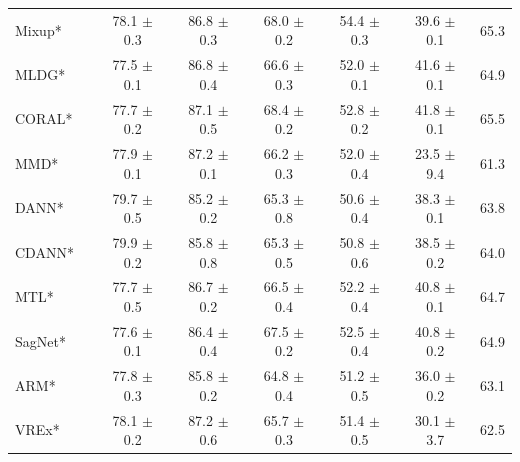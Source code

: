 \begin{table}[t]
\begin{tabular}{llcccccc}
Mixup*               &   \citep{yan2020improve}            		 & 78.1 $\pm$ 0.3            & 86.8 $\pm$ 0.3            & 68.0 $\pm$ 0.2            & 54.4 $\pm$ 0.3            & 39.6 $\pm$ 0.1            & 65.3                      \\
MLDG*                 &  \citep{LiYSH18}           				& 77.5 $\pm$ 0.1            & 86.8 $\pm$ 0.4            & 66.6 $\pm$ 0.3            & 52.0 $\pm$ 0.1            & 41.6 $\pm$ 0.1            & 64.9                      \\
CORAL*                &  \citep{SunS16}           			  & 77.7 $\pm$ 0.2            & 87.1 $\pm$ 0.5            & 68.4 $\pm$ 0.2            & 52.8 $\pm$ 0.2            & 41.8 $\pm$ 0.1            & 65.5                      \\
MMD*               &   \citep{LiPWK18}               			& 77.9 $\pm$ 0.1            & 87.2 $\pm$ 0.1            & 66.2 $\pm$ 0.3            & 52.0 $\pm$ 0.4            & 23.5 $\pm$ 9.4            & 61.3                      \\
DANN*              &  \citep{GaninUAGLLML16}              		& 79.7 $\pm$ 0.5            & 85.2 $\pm$ 0.2            & 65.3 $\pm$ 0.8            & 50.6 $\pm$ 0.4            & 38.3 $\pm$ 0.1            & 63.8                      \\
CDANN*            &  \citep{LiGTLT18}              			& 79.9 $\pm$ 0.2            & 85.8 $\pm$ 0.8            & 65.3 $\pm$ 0.5            & 50.8 $\pm$ 0.6            & 38.5 $\pm$ 0.2            & 64.0                      \\
MTL*                  &  \citep{blanchard2017domain}           	  & 77.7 $\pm$ 0.5            & 86.7 $\pm$ 0.2            & 66.5 $\pm$ 0.4            & 52.2 $\pm$ 0.4            & 40.8 $\pm$ 0.1            & 64.7                      \\
SagNet*             &   \citep{nam2019reducing}           	& 77.6 $\pm$ 0.1            & 86.4 $\pm$ 0.4            & 67.5 $\pm$ 0.2            & 52.5 $\pm$ 0.4            & 40.8 $\pm$ 0.2            & 64.9                      \\
ARM*                  &   \citep{zhang2020adaptive}           		& 77.8 $\pm$ 0.3            & 85.8 $\pm$ 0.2            & 64.8 $\pm$ 0.4            & 51.2 $\pm$ 0.5            & 36.0 $\pm$ 0.2            & 63.1                      \\
VREx*                 &    \citep{krueger2020outofdistribution}       	  & 78.1 $\pm$ 0.2            & 87.2 $\pm$ 0.6            & 65.7 $\pm$ 0.3            & 51.4 $\pm$ 0.5            & 30.1 $\pm$ 3.7            & 62.5                      \\

\end{tabular}
\end{table}
